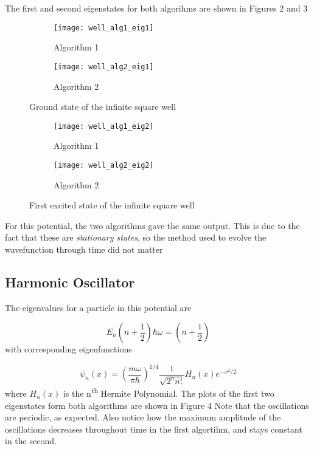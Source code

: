 \documentclass{article}
\begin{document}
The first and second eigenstates for both algorihms are shown in Figures 2 and 3                             

\begin{figure}
\centering
\begin{subfigure}[h!]{0.3\textwidth}
\centering
\texttt{[image: well\_alg1\_eig1]}
\caption{Algorithm 1}
\end{subfigure}
%
\begin{subfigure}[h!]{0.3\textwidth}
\centering
\texttt{[image: well\_alg2\_eig1]}
\caption{Algorithm 2}
\end{subfigure}

\caption{Ground state of the infinite square well}
\end{figure}

\begin{figure}
\centering
\begin{subfigure}[h!]{0.3\textwidth}
\centering
\texttt{[image: well\_alg1\_eig2]}
\caption{Algorithm 1}
\end{subfigure}
%
\begin{subfigure}[h!]{0.3\textwidth}
\centering
\texttt{[image: well\_alg2\_eig2]}
\caption{Algorithm 2}
\end{subfigure}

\caption{First excited state of the infinite square well}
\end{figure}

For this potential, the two algorithms gave the same output. This is due to the fact that these are {\it stationary states}, so the method used 
to evolve the wavefunction through time did not matter

\subsection{Harmonic Oscillator}

The eigenvalues for a particle in this potential are

\begin{equation}
E_n \left( n + \frac{1}{2} \right) \hbar \omega = \left( n + \frac{1}{2} \right)
\end{equation}
%
with corresponding eigenfunctions

\begin{equation}
\psi_n(x) = \left( \frac{m \omega}{\pi \hbar} \right)^{1/4} \frac{1}{\sqrt{2^n n!}} H_n(x)e^{-x^2/2}
\end{equation}
%
where $H_n(x)$ is the n\textsuperscript{th}  Hermite Polynomial. The plots of the first two eigenstates form both algorithms are shown in Figure 4
Note that the oscillations are periodic, as expected. Also notice how the maximum amplitude of the oscillations decreases throughout time in the first algortihm, and stays constant in the second.
\end{document}
